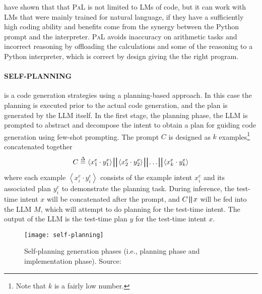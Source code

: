 \textcite{gao2022pal} have shown that that \textsc{PaL} is not limited to LMs of code, but it can work with LMs that were mainly trained for natural language, if they have a sufficiently high coding ability and benefits come from the synergy between the Python prompt and the interpreter.
\textsc{PaL} avoids inaccuracy on arithmetic tasks and incorrect reasoning by offloading the calculations and some of the reasoning to a Python interpreter, which is correct by design giving the the right program.

\paragraph{SELF-PLANNING}
\label{par:self-planning}

is a code generation strategies using a planning-based approach.
In this case the planning is executed prior to the actual code generation, and the plan is generated by the LLM itself.
In the first stage, the planning phase, the LLM is prompted to abstract and decompose the intent to obtain a plan for guiding code generation using few-shot prompting.
The prompt $C$ is designed as $k$ examples\footnote{Note that $k$ is a fairly low number.} concatenated together
\begin{equation}
	C \stackrel{\Delta}{=} \left\langle x^e_1 \cdot y^e_1 \right\rangle \bigparallel \left\langle x^e_2 \cdot y^e_2 \right\rangle \bigparallel \ldots \bigparallel \left\langle x^e_k \cdot y^e_k \right\rangle
	\label{eq:self-planning-eq}
\end{equation}
where each example $\left\langle x^e_i \cdot y^e_i \right\rangle$ consists of the example intent $x^e_i$ and its associated plan $y^e_i$ to demonstrate the planning task.
During inference, the test-time intent $x$ will be concatenated after the prompt, and $C \bigparallel x$ will be fed into the LLM $M$, which will attempt to do planning for the test-time intent.
The output of the LLM is the test-time plan $y$ for the test-time intent $x$.

\begin{figure}[h!]
	\centering
	\texttt{[image: self-planning]}
	\caption{Self-planning generation phases (i.e., planning phase and implementation phase). Source: \textcite{jiang2024selfplanning}}
	\label{fig:self-planning}
\end{figure}

